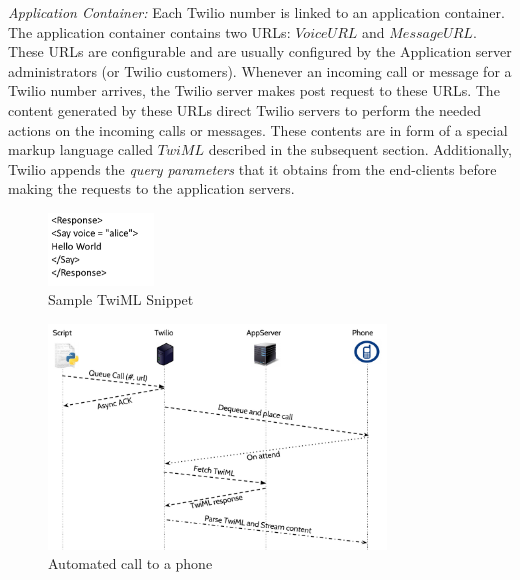 \emph{Application Container: } Each Twilio number is linked to an application container. The application container contains two URLs: $Voice URL$ and $Message URL$. These URLs are configurable and are usually configured by the Application server administrators (or Twilio customers). Whenever an incoming call or message for a Twilio number arrives, the Twilio server makes post request to these URLs. The content generated by these URLs direct Twilio servers to perform the needed actions on the incoming calls or messages. These contents are in form of a special markup language called $TwiML$ described in the subsequent section. Additionally, Twilio appends the \textit{query parameters} that it obtains from the end-clients before making the requests to the application servers. 
 \begin{figure}
 \centering
   \includegraphics[width=0.25\textwidth]{figs/TwiML.png}
 \caption{Sample TwiML Snippet}
 \label{fig:TwilML}
 \end{figure} 
\begin{figure}[t!] 
\centering
  \includegraphics[width=0.8\textwidth]{figs/auto.pdf}
\caption{Automated call to a phone}
\label{fig:autocall}
\end{figure} 

